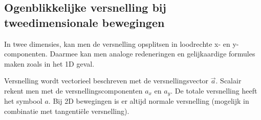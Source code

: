 \documentclass{ximera}
\begin{document}
	
\subsection*{Ogenblikkelijke versnelling bij tweedimensionale bewegingen}
	
In twee dimensies, kan men de versnelling opsplitsen in loodrechte x- en y-componenten. Daarmee kan men analoge redeneringen en gelijkaardige formules maken zoals in het 1D geval.
	


Versnelling wordt vectorieel beschreven met de versnellingsvector $\vec{a}$. 
Scalair rekent men met de versnellingscomponenten $a_x$ en $a_y$. 
De totale versnelling heeft het symbool $a$. 
Bij 2D bewegingen is er altijd normale versnelling (mogelijk in combinatie met tangentiële versnelling).
\end{document}
